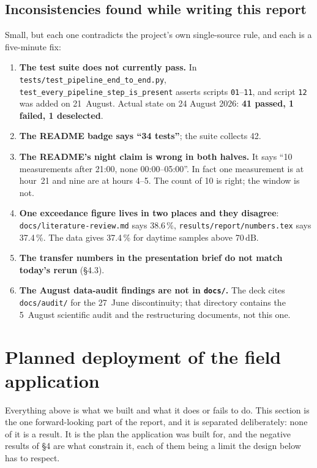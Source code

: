 \documentclass[11pt,a4paper]{article}
\newcommand{\dB}{\ensuremath{\,\mathrm{dB}}}
\newcommand{\pth}[1]{\texttt{\small #1}}
\begin{document}
\subsection{Inconsistencies found while writing this report}

Small, but each one contradicts the project's own single-source rule, and each is
a five-minute fix:

\begin{enumerate}
 \item \textbf{The test suite does not currently pass.} In
 \pth{tests/test\_pipeline\_end\_to\_end.py},\\
 \pth{test\_every\_pipeline\_step\_is\_present}
 asserts scripts \pth{01}--\pth{11}, and script \pth{12} was added on
 21~August. Actual state on 24 August 2026:
 \textbf{41 passed, 1 failed, 1 deselected}.
 \item \textbf{The README badge says ``34 tests''}; the suite collects 42.
 \item \textbf{The README's night claim is wrong in both halves.} It says ``10
 measurements after 21:00, none 00:00--05:00''. In fact one measurement is
 at hour~21 and nine are at hours 4--5. The count of 10 is right; the
 window is not.
 \item \textbf{One exceedance figure lives in two places and they disagree}:
 \pth{docs/literature-review.md} says 38.6\,\%,
 \pth{results/report/numbers.tex} says 37.4\,\%. The data gives 37.4\,\%
 for daytime samples above 70\dB.
 \item \textbf{The transfer numbers in the presentation brief do not match
 today's rerun} (§4.3).
 \item \textbf{The August data-audit findings are not in \pth{docs/}.} The deck
 cites \pth{docs/audit/} for the 27~June discontinuity; that directory
 contains the 5~August scientific audit and the restructuring documents,
 not this one.
\end{enumerate}

\section{Planned deployment of the field application}

Everything above is what we built and what it does or fails to do.
This section is the one forward-looking part of the report, and it is separated
deliberately: none of it is a result. It is the plan the application was built
for, and the negative results of §4 are what constrain it, each of them being a limit the design below has to respect.
\end{document}
